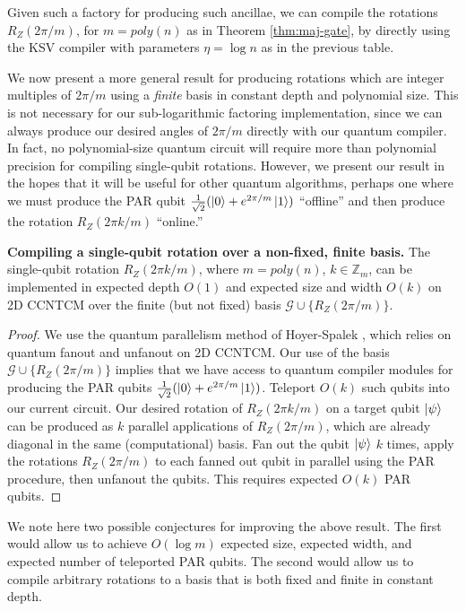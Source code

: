 Given such a factory for producing such ancillae, we can compile the
rotations $R_Z(2\pi / m)$, for $m = poly(n)$ as in Theorem \ref{thm:maj-gate},
by directly using the KSV compiler with parameters $\eta = \log n$ as in the
previous table.

We now present a more general result for
producing rotations which are integer multiples of $2\pi / m$ 
using a \emph{finite}
basis in constant depth and polynomial size.
This is not necessary for our sub-logarithmic factoring implementation,
since we can always produce our desired angles of $2\pi / m$ directly
with our quantum compiler.
In fact, no polynomial-size quantum circuit will require more than
polynomial precision for compiling single-qubit rotations. However, we
present our result in the hopes that it will be useful for other
quantum algorithms, perhaps one where we must produce the
PAR qubit $\frac{1}{\sqrt{2}} ( \left\vert{0}\right\rangle + e^{2\pi / m}\left\vert{1}\right\rangle )$ ``offline'' and then produce
the rotation $R_Z(2\pi k / m)$ ``online.''

\begin{theorem}{\textbf{Compiling a single-qubit rotation over a non-fixed, finite basis.}}
The single-qubit rotation $R_Z(2\pi k /m)$, where $m = poly(n)$,
$k \in \mathbb{Z}_m$,
can be implemented in expected depth $O(1)$ and expected size and width $O(k)$ on
\textsf{2D CCNTCM} over the finite
(but not fixed) basis $\mathcal{G} \cup \{R_Z(2\pi / m)\}$.
\label{thm:qcompile}
\end{theorem}

\begin{proof}
We use the quantum parallelism method of Hoyer-Spalek \cite{Hoyer2002},
which relies on quantum fanout and unfanout on \textsf{2D CCNTCM}.
Our use of the basis $\mathcal{G} \cup \{R_Z(2\pi / m)\}$ implies that
we have access to quantum compiler modules for producing the
PAR qubits $\frac{1}{\sqrt{2}} ( \left\vert{0}\right\rangle + e^{2\pi / m}\left\vert{1}\right\rangle )$. Teleport $O(k)$ such qubits
into our current circuit.
Our desired rotation of $R_Z(2\pi k / m)$ on a target qubit $\left\vert{\psi}\right\rangle$
can be produced as $k$
parallel applications of $R_Z(2\pi / m)$, which are already diagonal in
the same (computational) basis. Fan out the qubit $\left\vert{\psi}\right\rangle$ $k$ times,
apply the rotations $R_Z(2\pi /m)$ to each fanned out qubit in parallel
using the PAR procedure, then unfanout the
qubits.
This requires expected $O(k)$ PAR qubits.
\end{proof}

We note here two possible conjectures for improving the above result.
The first would allow us to achieve $O(\log m)$
expected size, expected width, and
expected number of teleported PAR qubits. The second would allow us to
compile arbitrary rotations to a basis that is both fixed and finite
in constant depth.

